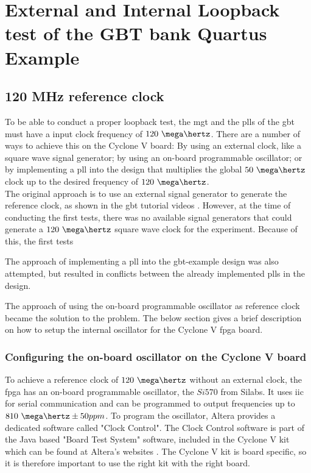 \documentclass[main.tex]{subfiles}
\begin{document}
\chapter{External and Internal Loopback test of the GBT bank Quartus Example}

\section{120 MHz reference clock}

To be able to conduct a proper loopback test, the \gls{mgt} and the \glspl{pll} of the \gls{gbt}  must have a input clock frequency of $120~\mega\hertz$. There are a number of ways to achieve this on the Cyclone V board: By using an external clock, like a square wave signal generator; by using an on-board programmable oscillator; or by implementing a \gls{pll} into the design that multiplies the global $50~\mega\hertz$ clock up to the desired frequency of $120~\mega\hertz$. \\

The original approach is to use an external signal generator to generate the reference clock, as shown in the \gls{gbt} tutorial videos \cite{gbt_videos}. However, at the time of conducting the first tests, there was no available signal generators that could generate a $120~\mega\hertz$ square wave clock for the experiment. Because of this, the first tests 

The approach of implementing a \gls{pll} into the \gls{gbt}-example design was also attempted, but resulted in conflicts between the already implemented \glspl{pll} in the design. 

The approach of using the on-board programmable oscillator as reference clock became the solution to the problem. The below section gives a brief description on how to setup the internal oscillator for the Cyclone V \gls{fpga} board.

\subsection{Configuring the on-board oscillator on the Cyclone V board}

To achieve a reference clock of $120~\mega\hertz$ without an external clock, the \gls{fpga} has an on-board programmable oscillator, the $Si570$ from Silabs. It uses \gls{iic} for serial communication and can be programmed to output frequencies up to $810~\mega\hertz \pm 50 ppm$. To program the oscillator, Altera provides a dedicated software called "Clock Control". The Clock Control software is part of the Java based "Board Test System" software, included in the Cyclone V kit which can be found at Altera's websites \cite{altera_cyclonekit}. The Cyclone V kit is board specific, so it is therefore important to use the right kit with the right board.\\
\end{document}
